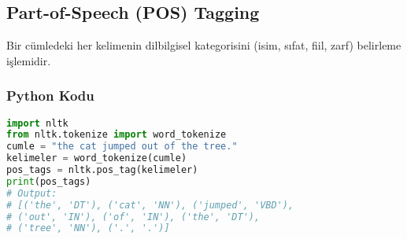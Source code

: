 \newpage

\subsection{Part-of-Speech (POS) Tagging}
Bir cümledeki her kelimenin dilbilgisel kategorisini (isim, sıfat, fiil, zarf) belirleme işlemidir.

\subsubsection{Python Kodu}

\begin{lstlisting}[language=Python]
import nltk
from nltk.tokenize import word_tokenize
cumle = "the cat jumped out of the tree."
kelimeler = word_tokenize(cumle)
pos_tags = nltk.pos_tag(kelimeler)
print(pos_tags)
# Output:
# [('the', 'DT'), ('cat', 'NN'), ('jumped', 'VBD'),
# ('out', 'IN'), ('of', 'IN'), ('the', 'DT'),
# ('tree', 'NN'), ('.', '.')]
\end{lstlisting}

